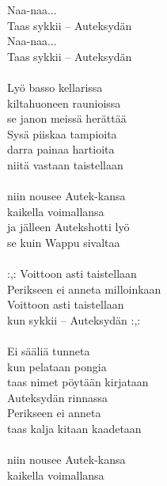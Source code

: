 
            Naa-naa... \\
            Taas sykkii – Auteksydän \\
            Naa-naa... \\
            Taas sykkii – Auteksydän \\
\hspace{10mm} \\
            Lyö basso kellarissa \\
            kiltahuoneen raunioissa \\
            se janon meissä herättää \\
            Sysä piiskaa tampioita \\
            darra painaa hartioita \\
            niitä vastaan taistellaan \\
\hspace{10mm} \\
            niin nousee Autek-kansa \\
            kaikella voimallansa \\
            ja jälleen Autekshotti lyö \\
            se kuin Wappu sivaltaa \\
\hspace{10mm} \\
            :,: Voittoon asti taistellaan \\
            Perikseen ei anneta milloinkaan \\
            Voittoon asti taistellaan \\
            kun sykkii – Auteksydän :,: \\
\hspace{10mm} \\
            Ei sääliä tunneta \\
            kun pelataan pongia \\
            taas nimet pöytään kirjataan \\
            Auteksydän rinnassa \\
            Perikseen ei anneta \\
            taas kalja kitaan kaadetaan \\
\hspace{10mm} \\
            niin nousee Autek-kansa \\
            kaikella voimallansa \\
